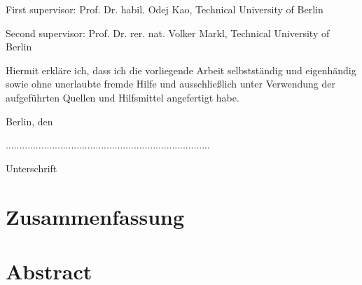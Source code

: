 \rule{0cm}{20cm}

\noindent First supervisor: 
\noindent Prof. Dr. habil. Odej Kao, Technical University of Berlin

\noindent Second supervisor: 
\noindent Prof. Dr. rer. nat. Volker Markl, Technical University of Berlin

\thispagestyle{empty}

\rule{0cm}{10cm}

\noindent Hiermit erkl\"are ich, dass ich die vorliegende Arbeit selbstst\"andig und eigenh\"andig sowie ohne
unerlaubte fremde Hilfe und ausschließlich unter Verwendung der aufgef\"uhrten Quellen und
Hilfsmittel angefertigt habe.

Berlin, den

\vspace{1cm}
...........................................................................

Unterschrift
\vspace{1cm}


\thispagestyle{empty}




\chapter*{Zusammenfassung}

\abstracttextde

\thispagestyle{empty}
\newpage
\vspace*{3cm}
\thispagestyle{empty}

\chapter*{Abstract}

\abstracttext

\thispagestyle{empty}
\newpage
\vspace*{3cm}
\thispagestyle{empty}



\setcounter{page}{8}
\tableofcontents

\newpage


\listoffigures
\listoflistings
\newpage
\thispagestyle{empty}
\newpage
\vspace*{3cm}
\thispagestyle{empty} \newpage
{}\setcounter{page}{1}